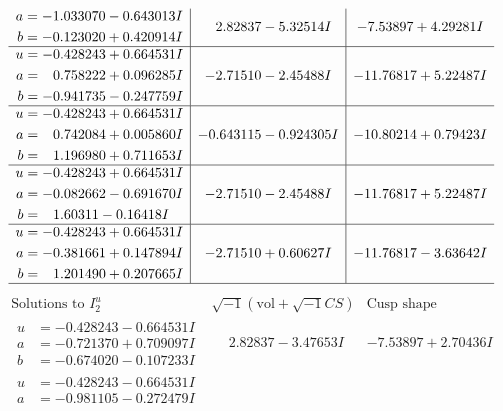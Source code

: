 \documentclass[1p]{elsarticle_modified}
\theoremstyle{definition}
\newcommand{\I}{\sqrt{-1}}
\begin{document}
$$\begin{array}{c|c|c}
\begin{aligned}
a &= -1.033070 - 0.643013 I \\
b &= -0.123020 + 0.420914 I\end{aligned}
 & \phantom{-}2.82837 - 5.32514 I & -7.53897 + 4.29281 I \\ \hline\begin{aligned}
u &= -0.428243 + 0.664531 I \\
a &= \phantom{-}0.758222 + 0.096285 I \\
b &= -0.941735 - 0.247759 I\end{aligned}
 & -2.71510 - 2.45488 I & -11.76817 + 5.22487 I \\ \hline\begin{aligned}
u &= -0.428243 + 0.664531 I \\
a &= \phantom{-}0.742084 + 0.005860 I \\
b &= \phantom{-}1.196980 + 0.711653 I\end{aligned}
 & -0.643115 - 0.924305 I & -10.80214 + 0.79423 I \\ \hline\begin{aligned}
u &= -0.428243 + 0.664531 I \\
a &= -0.082662 - 0.691670 I \\
b &= \phantom{-}1.60311 - 0.16418 I\end{aligned}
 & -2.71510 - 2.45488 I & -11.76817 + 5.22487 I \\ \hline\begin{aligned}
u &= -0.428243 + 0.664531 I \\
a &= -0.381661 + 0.147894 I \\
b &= \phantom{-}1.201490 + 0.207665 I\end{aligned}
 & -2.71510 + 0.60627 I & -11.76817 - 3.63642 I\\
 \hline 
 \end{array}$$\newpage$$\begin{array}{c|c|c}  
\text{Solutions to }I^u_{2}& \I (\text{vol} + \sqrt{-1}CS) & \text{Cusp shape}\\
 \hline 
\begin{aligned}
u &= -0.428243 - 0.664531 I \\
a &= -0.721370 + 0.709097 I \\
b &= -0.674020 - 0.107233 I\end{aligned}
 & \phantom{-}2.82837 - 3.47653 I & -7.53897 + 2.70436 I \\ \hline\begin{aligned}
u &= -0.428243 - 0.664531 I \\
a &= -0.981105 - 0.272479 I \\

\end{aligned}
\end{array}$$
\end{document}
